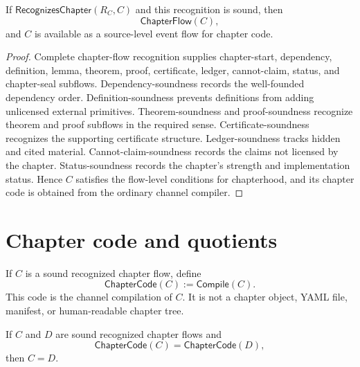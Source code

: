 \begin{theorem}
\label{thm:chapter-generated-sound-establishes-chapterhood}
If $\mathsf{RecognizesChapter}(R_C,C)$ and this recognition is sound, then
$$
  \mathsf{ChapterFlow}(C),
$$
and $C$ is available as a source-level event flow for chapter code.
\end{theorem}

\begin{proof}
Complete chapter-flow recognition supplies chapter-start, dependency, definition, lemma, theorem, proof, certificate, ledger, cannot-claim, status, and chapter-seal subflows. Dependency-soundness records the well-founded dependency order. Definition-soundness prevents definitions from adding unlicensed external primitives. Theorem-soundness and proof-soundness recognize theorem and proof subflows in the required sense. Certificate-soundness recognizes the supporting certificate structure. Ledger-soundness tracks hidden and cited material. Cannot-claim-soundness records the claims not licensed by the chapter. Status-soundness records the chapter's strength and implementation status. Hence $C$ satisfies the flow-level conditions for chapterhood, and its chapter code is obtained from the ordinary channel compiler.
\end{proof}

\section{Chapter code and quotients}
\label{sec:chapter-generated-code-and-quotients}

\begin{definition}
\label{def:chapter-generated-chapter-code}
If $C$ is a sound recognized chapter flow, define
$$
  \mathsf{ChapterCode}(C):=\mathsf{Compile}(C).
$$
This code is the channel compilation of $C$. It is not a chapter object, YAML file, manifest, or human-readable chapter tree.
\end{definition}

\begin{proposition}
\label{prop:chapter-generated-code-injective}
If $C$ and $D$ are sound recognized chapter flows and
$$
  \mathsf{ChapterCode}(C)=\mathsf{ChapterCode}(D),
$$
then $C=D$.
\end{proposition}

